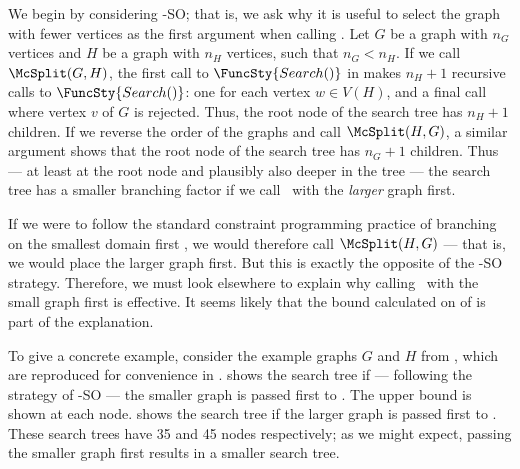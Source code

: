 We begin by considering \McSplit-SO; that is, we
ask why it is useful to select the graph with fewer vertices as the first argument
when calling \McSplit.  Let $G$
be a graph with $n_G$ vertices and $H$ be a graph with $n_H$ vertices, such that $n_G < n_H$.
If we call $\McSplit(G,H)$, the first call to $\FuncSty{Search()}$ in 
makes $n_H + 1$ recursive calls to $\FuncSty{Search()}$: one for each vertex $w \in V(H)$,
and a final call where vertex $v$ of $G$ is rejected.  Thus, the root node of the search tree
has $n_H + 1$ children. If we reverse the order of the graphs and
call $\McSplit(H,G)$, a similar argument shows that the root node of the search tree
has $n_G + 1$ children.  Thus --- at least at the root node and plausibly also deeper in the
tree --- the search tree has a smaller branching factor if we call \McSplit\ with the
\emph{larger} graph first.

If we were to follow the standard constraint programming practice of branching
on the smallest domain first \cite{DBLP:journals/ai/HaralickE80}, we would 
therefore call $\McSplit(H,G)$ --- that is, we would place the larger graph first.
But this is exactly the opposite of the \McSplit-SO strategy.
Therefore, we must look elsewhere to explain why calling \McSplit\ with the small
graph first is effective.  It seems likely that the bound calculated on 
of  is part of the explanation.

To give a concrete example, consider the example graphs $G$ and $H$ from
, which are reproduced for convenience in .
 shows the search tree if --- following the
strategy of \McSplit-SO --- the smaller graph is passed first to \McSplit.
The upper bound is shown at each node.
 shows the search tree if the larger graph
is passed first to \McSplit.  These search trees have 35 and 45 nodes respectively;
as we might expect, passing the smaller graph first results in a smaller search tree.

